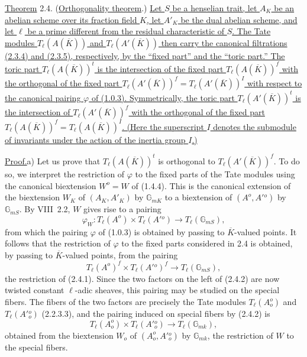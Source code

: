 \medskip
\noindent
\underline{Theorem} 2.4. (\underline{Orthogonality theorem}.)
\underline{Let $S$ be a henselian trait, let $A_K$ be an abelian scheme
over its fraction field $K$, let $A'_K$ be the dual abelian scheme, and
let $\ell$ be a prime different from the residual characteristic of
$S$.  The Tate modules $T_\ell(A(\overline K))$ and
$T_\ell(A'(\overline K))$ then carry the canonical filtrations (2.3.4)
and (2.3.5), respectively, by the ``fixed part'' and the ``toric
part.''  The toric part $T_\ell(A(\overline K))^t$ is the intersection
of the fixed part $T_\ell(A(\overline K))^f$ with the orthogonal of the
fixed part
$T_\ell(A'(\overline K))^f=T_\ell(A'(\overline K))^I$ with respect to
the canonical pairing $\varphi$ of (1.0.3).  Symmetrically, the toric
part $T_\ell(A'(\overline K))^t$ is the intersection of
$T_\ell(A'(\overline K))^f$ with the orthogonal of the fixed part
$T_\ell(A(\overline K))^f=T_\ell(A(\overline K))^I$.  (Here the
superscript $I$ denotes the submodule of invariants under the action of
the inertia group $I$.)}

\smallskip
\noindent
\underline{Proof.}\quad a) Let us prove that
$T_\ell(A(\overline K))^t$ is orthogonal to
$T_\ell(A'(\overline K))^f$.  To do so, we interpret the restriction of
$\varphi$ to the fixed parts of the Tate modules using the canonical
biextension $W^o=W$ of (1.4.4).  This is the canonical extension of the
biextension $W_K$ of $(A_K,A'_K)$ by $\mathbb G_{mK}$ to a biextension
of $(A^o,A'{}^o)$ by $\mathbb G_{mS}$.  By VIII~2.2, $W$ gives rise to
a pairing
\begin{equation}\tag{2.4.1}
 \varphi_W:T_\ell(A^o)\times T_\ell(A'{}^o)
 \longrightarrow T_\ell(\mathbb G_{mS}),
\end{equation}
from which the pairing $\varphi$ of (1.0.3) is obtained by passing to
$\overline K$-valued points.  It follows that the restriction of
$\varphi$ to the fixed parts considered in 2.4 is obtained, by passing
to $\overline K$-valued points, from the pairing
\begin{equation}\tag{2.4.2}
 T_\ell(A^o)^f\times T_\ell(A'{}^o)^f
 \longrightarrow T_\ell(\mathbb G_{mS}),
\end{equation}
the restriction of (2.4.1).  Since the two factors on the left of
(2.4.2) are now twisted constant $\ell$-adic sheaves, this pairing may
be studied on the special fibers.  The fibers of the two factors are
precisely the Tate modules $T_\ell(A_o^o)$ and
$T_\ell(A'{}_o^o)$ (2.2.3.3), and the pairing induced on special fibers
by (2.4.2) is
\begin{equation}\tag{2.4.3}
 T_\ell(A_o^o)\times T_\ell(A'{}_o^o)
 \longrightarrow T_\ell(\mathbb G_{mk}),
\end{equation}
obtained from the biextension $W_o$ of $(A_o^o,A'{}_o^o)$ by
$\mathbb G_{mk}$, the restriction of $W$ to the special fibers.

